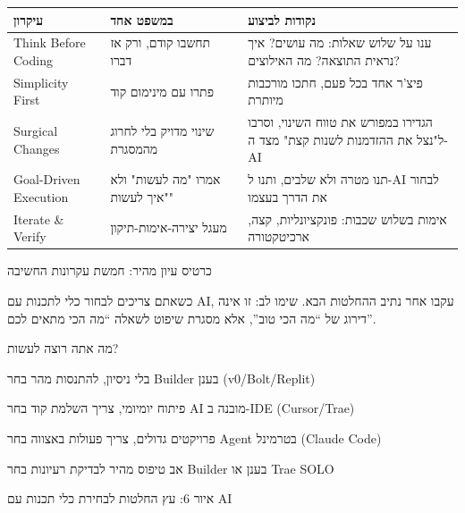 


\begin{center}
\begin{tabularx}{\linewidth}{|X|X|X|}
\hline
\textbf{עיקרון} & \textbf{במשפט אחד} & \textbf{נקודות לביצוע} \tabularnewline
\hline
Think Before Coding & תחשבו קודם, ורק אז דברו & ענו על שלוש שאלות: מה עושים? איך נראית התוצאה? מה האילוצים? \tabularnewline
Simplicity First & פתרו עם מינימום קוד & פיצ'ר אחד בכל פעם, חתכו מורכבות מיותרת \tabularnewline
Surgical Changes & שינוי מדויק בלי לחרוג מהמסגרת & הגדירו במפורש את טווח השינוי, וסרבו ל"נצל את ההזדמנות לשנות קצת" מצד ה-AI \tabularnewline
Goal-Driven Execution & אמרו "מה לעשות" ולא "איך לעשות" & תנו מטרה ולא שלבים, ותנו ל-AI לבחור את הדרך בעצמו \tabularnewline
Iterate \& Verify & מעגל יצירה-אימות-תיקון & אימות בשלוש שכבות: פונקציונליות, קצה, ארכיטקטורה \tabularnewline
\hline
\end{tabularx}
\end{center}

\begin{center}\small\color{gray}כרטיס עיון מהיר: חמשת עקרונות החשיבה\end{center}


כשאתם צריכים לבחור כלי לתכנות עם AI, עקבו אחר נתיב ההחלטות הבא. שימו לב: זו אינה דירוג של “מה הכי טוב”, אלא מסגרת שיפוט לשאלה “מה הכי מתאים לכם”.

מה אתה רוצה לעשות?

בלי ניסיון, להתנסות מהר בחר Builder בענן (v0/Bolt/Replit)

פיתוח יומיומי, צריך השלמת קוד בחר AI מובנה ב-IDE (Cursor/Trae)

פרויקטים גדולים, צריך פעולות באצווה בחר Agent בטרמינל (Claude Code)

אב טיפוס מהיר לבדיקת רעיונות בחר Builder בענן או Trae SOLO

\begin{center}\small\color{gray}איור 6: עץ החלטות לבחירת כלי תכנות עם AI\end{center}

